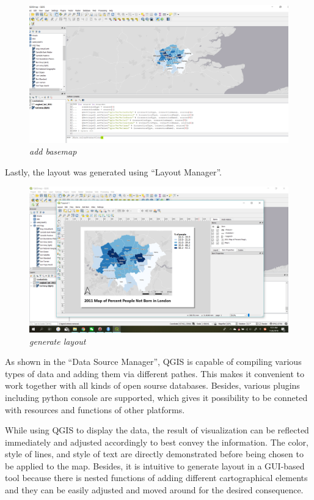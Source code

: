 \documentclass[]{article}
\begin{document}
\begin{figure}
\centering
\includegraphics{Part1/pngs/basemap.png}
\caption{\emph{add basemap}}
\end{figure}

Lastly, the layout was generated using ``Layout Manager''.

\begin{figure}
\centering
\includegraphics{Part1/pngs/layout.png}
\caption{\emph{generate layout}}
\end{figure}

As shown in the ``Data Source Manager'', QGIS is capable of compiling
various types of data and adding them via different pathes. This makes
it convenient to work together with all kinds of open sourse databases.
Besides, various plugins including python console are supported, which
gives it possibility to be conneted with resources and functions of
other platforms.

While using QGIS to display the data, the result of visualization can be
reflected immediately and adjusted accordingly to best convey the
information. The color, style of lines, and style of text are directly
demonstrated before being chosen to be applied to the map. Besides, it
is intuitive to generate layout in a GUI-based tool because there is
nested functions of adding different cartographical elements and they
can be easily adjusted and moved around for the desired consequence.
\end{document}
